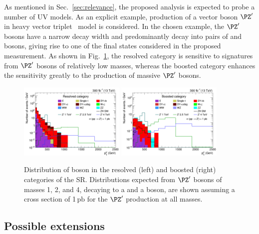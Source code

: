 \documentclass[a4paper,11pt]{article}
\newcommand{\pb} {\mbox{\ensuremath{\,\text{pb}}}\xspace}
\begin{document}
As mentioned in Sec.~\ref{sec:relevance}, the proposed analysis is expected to probe a number of UV models. 
As an explicit example, production of a vector boson $\PZ^{\prime}$ in heavy vector triplet~\cite{Pappadopulo:2014qza} model is considered.
In the chosen example, the  $\PZ^{\prime}$ bosons have a narrow decay width and predominantly decay into pairs of \PZ and \PH bosons, giving rise to one of the final states considered in the proposed measurement. 
As shown in Fig.~\ref{fig:Zprime}, the resolved category is sensitive to  signatures from $\PZ^{\prime}$ bosons of relatively low masses, whereas the boosted category enhances the sensitivity greatly to the production of massive $\PZ^{\prime}$ bosons.
\begin{figure}[t]
\begin{center}
\includegraphics[width=0.45\textwidth]{Figures/RECO/ZH/ZPrime/Plot_Resolved_SR_V_pt.png}
\includegraphics[width=0.45\textwidth]{Figures/RECO/ZH/ZPrime/Plot_Boosted_SR_V_pt.png}
\end{center}
\caption{
Distribution of \PZ boson \pt in the resolved (left) and boosted (right) categories of the SR. Distributions expected from $\PZ^{\prime}$ bosons of masses 1, 2, and 4\TeV, decaying to a \PZ and a \PH boson, are shown assuming a cross section of 1\pb for the $\PZ^{\prime}$ production at all masses. 
}
\label{fig:Zprime}
\end{figure}

\subsection{Possible extensions}
\end{document}
